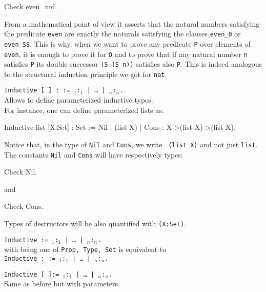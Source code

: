 \begin{coq_example}
Check even_ind.
\end{coq_example}

From a mathematical point of view it asserts that the natural numbers
satisfying the predicate {\tt even} are exactly the naturals satisfying
the clauses {\tt even\_0} or {\tt even\_SS}. This is why, when we want
to prove any predicate {\tt P} over elements of {\tt even}, it is
enough to prove it for {\tt O} and to prove that if any natural number
{\tt n} satisfies {\tt P} its double successor {\tt (S (S n))}
satisfies also {\tt P}. This is indeed analogous to the structural
induction principle we got for {\tt nat}.

\begin{ErrMsgs}
\item {}
\item {}
\end{ErrMsgs}

\begin{Variants}
\item {\tt Inductive {\ident} [ {\params} ] : {\term} :=
    {\ident$_1$}:{\term$_1$} | {\ldots} | {\ident$_n$}:\term$_n$.}\\ Allows
  to define parameterized inductive types.\\
  For instance, one can define
  parameterized lists as:
\begin{coq_example*}
Inductive list [X:Set] : Set :=
 Nil : (list X) | Cons : X->(list X)->(list X).
\end{coq_example*}
Notice that, in the type of {\tt Nil} and {\tt Cons}, we write {\tt
  (list X)} and not just {\tt list}.\\ The constants {\tt Nil} and
{\tt Cons} will have respectively types:

\begin{coq_example}
Check Nil.
\end{coq_example}
and

\begin{coq_example}
Check Cons.
\end{coq_example}

Types of destructors will be also quantified with {\tt (X:Set)}.
\item  {\tt Inductive {\sort} {\ident} :=
{\ident$_1$}:{\term$_1$} | {\ldots} | {\ident$_n$}:\term$_n$.}\\ 
with {\sort} being one of {\tt Prop, Type, Set} is
equivalent to \\ {\tt Inductive {\ident} : {\sort} :=
  {\ident$_1$}:{\term$_1$} | {\ldots} | {\ident$_n$}:\term$_n$.}
\item {\tt Inductive {\sort} {\ident} [ {\params} ]:=
{\ident$_1$}:{\term$_1$} | {\ldots} | {\ident$_n$}:\term$_n$.}\\ 
      Same as before but with parameters.
\end{Variants}

